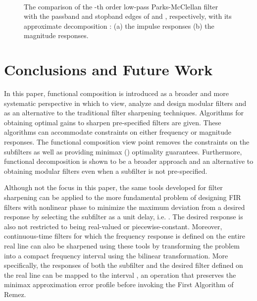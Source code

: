 \documentclass[journal] {IEEEtran}
\begin{document}
\begin{figure}
\centering
{}\\
\caption{The comparison of the -th order low-pass Parks-McClellan filter  with the passband and stopband edges of  and , respectively, with its approximate decomposition : (a) the impulse responses (b) the magnitude responses.}\label{fig:applications::symmetric_approx_decomp_FIR}
\end{figure}


\section{Conclusions and Future Work}\label{sec:conclusions}
In this paper, functional composition is introduced as a broader and more systematic perspective in which to view, analyze and design modular filters and as an alternative to the traditional filter sharpening techniques. Algorithms for obtaining optimal gains to sharpen pre-specified filters are given. These algorithms can accommodate constraints on either frequency or magnitude responses. The functional composition view point removes the constraints on the subfilters as well as providing minimax () optimality guarantees. Furthermore, functional decomposition is shown to be a broader approach and an alternative to obtaining modular filters even when a subfilter is not pre-specified.

Although not the focus in this paper, the same tools developed for filter sharpening can be applied to the more fundamental problem of designing FIR filters with nonlinear phase to minimize the maximum deviation from a desired response by selecting the subfilter as a unit delay, i.e. . The desired response  is also not restricted to being real-valued or piecewise-constant. Moreover, continuous-time filters for which the frequency response is defined on the entire real line can also be sharpened using these tools by transforming the problem into a compact frequency interval using the bilinear transformation. More specifically, the responses of both the subfilter and the desired filter defined on the real line can be mapped to the interval , an operation that preserves the minimax approximation error profile before invoking the First Algorithm of Remez.
\end{document}
